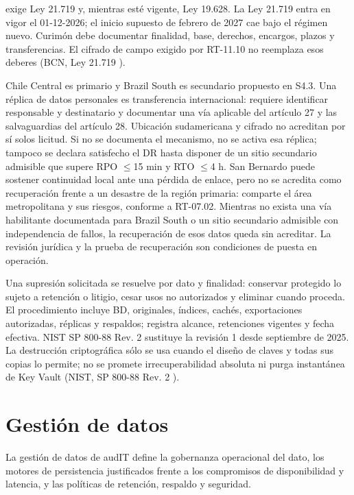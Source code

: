  exige Ley 21.719 y, mientras esté vigente, Ley 19.628. La Ley 21.719 entra en vigor el 01-12-2026; el inicio supuesto de febrero de 2027 cae bajo el régimen nuevo. Curimón debe documentar finalidad, base, derechos, encargos, plazos y transferencias. El cifrado de campo exigido por RT-11.10 no reemplaza esos deberes (BCN, Ley 21.719 \parencite{d3_ley21719}).

Chile Central es primario y Brazil South es secundario propuesto en S4.3. Una réplica de datos personales es transferencia internacional: requiere identificar responsable y destinatario y documentar una vía aplicable del artículo 27 y las salvaguardias del artículo 28. Ubicación sudamericana y cifrado no acreditan por sí solos licitud. Si no se documenta el mecanismo, no se activa esa réplica; tampoco se declara satisfecho el DR hasta disponer de un sitio secundario admisible que supere RPO $\leq$15 min y RTO $\leq$4 h. San Bernardo puede sostener continuidad local ante una pérdida de enlace, pero no se acredita como recuperación frente a un desastre de la región primaria: comparte el área metropolitana y sus riesgos, conforme a RT-07.02. Mientras no exista una vía habilitante documentada para Brazil South o un sitio secundario admisible con independencia de fallos, la recuperación de esos datos queda sin acreditar. La revisión jurídica y la prueba de recuperación son condiciones de puesta en operación.

Una supresión solicitada se resuelve por dato y finalidad: conservar protegido lo sujeto a retención o litigio, cesar usos no autorizados y eliminar cuando proceda. El procedimiento incluye BD, originales, índices, cachés, exportaciones autorizadas, réplicas y respaldos; registra alcance, retenciones vigentes y fecha efectiva. NIST SP 800-88 Rev. 2 sustituye la revisión 1 desde septiembre de 2025. La destrucción criptográfica sólo se usa cuando el diseño de claves y todas sus copias lo permite; no se promete irrecuperabilidad absoluta ni purga instantánea de Key Vault (NIST, SP 800-88 Rev. 2 \parencite{d3_nist88r2}).

\section{Gestión de datos}\label{sec:5-gestion-datos}\label{sec:05-gestion-de-datos}

La gestión de datos de audIT define la gobernanza operacional del dato, los motores de persistencia justificados frente a los compromisos de disponibilidad y latencia, y las políticas de retención, respaldo y seguridad.

